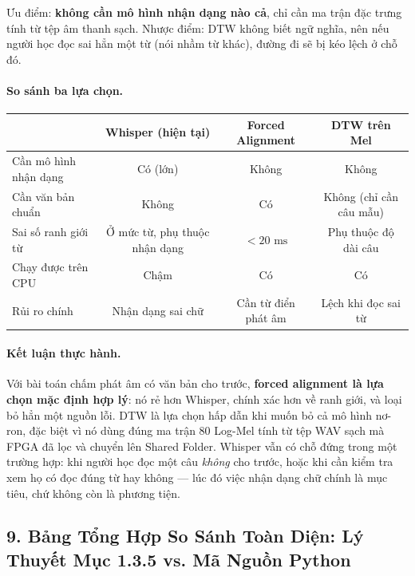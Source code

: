 \documentclass[11pt,a4paper]{article}
\begin{document}
Ưu điểm: \textbf{không cần mô hình nhận dạng nào cả}, chỉ cần ma trận đặc trưng tính từ tệp âm thanh sạch. Nhược điểm: DTW không biết ngữ nghĩa, nên nếu người học đọc sai hẳn một từ (nói nhầm từ khác), đường đi sẽ bị kéo lệch ở chỗ đó.

\paragraph{So sánh ba lựa chọn.}
\begin{center}
\small
\begin{tabular}{@{}lccc@{}}
\toprule
 & \textbf{Whisper (hiện tại)} & \textbf{Forced Alignment} & \textbf{DTW trên Mel} \\ \midrule
Cần mô hình nhận dạng & Có (lớn) & Không & Không \\
Cần văn bản chuẩn & Không & Có & Không (chỉ cần câu mẫu) \\
Sai số ranh giới từ & Ở mức từ, phụ thuộc nhận dạng & $< 20\text{ ms}$ & Phụ thuộc độ dài câu \\
Chạy được trên CPU & Chậm & Có & Có \\
Rủi ro chính & Nhận dạng sai chữ & Cần từ điển phát âm & Lệch khi đọc sai từ \\
\bottomrule
\end{tabular}
\end{center}

\paragraph{Kết luận thực hành.}
Với bài toán chấm phát âm có văn bản cho trước, \textbf{forced alignment là lựa chọn mặc định hợp lý}: nó rẻ hơn Whisper, chính xác hơn về ranh giới, và loại bỏ hẳn một nguồn lỗi. DTW là lựa chọn hấp dẫn khi muốn bỏ cả mô hình nơ-ron, đặc biệt vì nó dùng đúng ma trận 80 Log-Mel tính từ tệp WAV sạch mà FPGA đã lọc và chuyển lên Shared Folder. Whisper vẫn có chỗ đứng trong một trường hợp: khi người học đọc một câu \emph{không} cho trước, hoặc khi cần kiểm tra xem họ có đọc đúng từ hay không --- lúc đó việc nhận dạng chữ chính là mục tiêu, chứ không còn là phương tiện.

\subsection*{9. Bảng Tổng Hợp So Sánh Toàn Diện: Lý Thuyết Mục 1.3.5 vs. Mã Nguồn Python}
\end{document}
